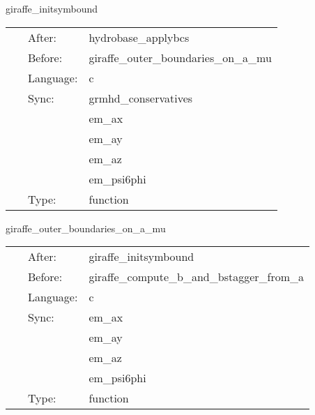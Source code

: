 \vspace{5mm}


\hspace{5mm} giraffe\_initsymbound 

\hspace{5mm}{\it schedule symmetries -- actually just a placeholder function to ensure prolongations / processor syncs are done before outer boundaries are updated. } 


\hspace{5mm}

 \begin{tabular*}{160mm}{cll} 
~ & After:  & hydrobase\_applybcs \\ 
~ & Before:  & giraffe\_outer\_boundaries\_on\_a\_mu \\ 
~ & Language:  & c \\ 
~ & Sync:  & grmhd\_conservatives \\ 
~& ~ &em\_ax\\ 
~& ~ &em\_ay\\ 
~& ~ &em\_az\\ 
~& ~ &em\_psi6phi\\ 
~ & Type:  & function \\ 
\end{tabular*} 


\vspace{5mm}


\hspace{5mm} giraffe\_outer\_boundaries\_on\_a\_mu 

\hspace{5mm}{\it apply linear extrapolation bcs on a\_mu, so that bcs are flat on b\^i. } 


\hspace{5mm}

 \begin{tabular*}{160mm}{cll} 
~ & After:  & giraffe\_initsymbound \\ 
~ & Before:  & giraffe\_compute\_b\_and\_bstagger\_from\_a \\ 
~ & Language:  & c \\ 
~ & Sync:  & em\_ax \\ 
~& ~ &em\_ay\\ 
~& ~ &em\_az\\ 
~& ~ &em\_psi6phi\\ 
~ & Type:  & function \\ 
\end{tabular*} 


